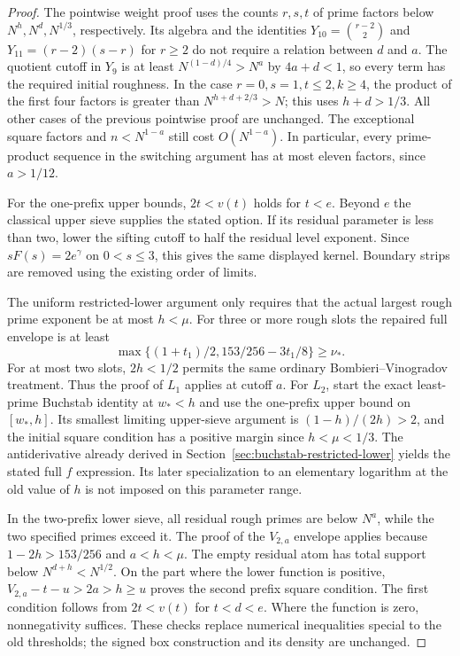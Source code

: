 \begin{proof}
The pointwise weight proof uses the counts $r,s,t$ of prime factors
below $N^h,N^d,N^{1/3}$, respectively. Its algebra and the identities
$Y_{10}=\binom{r-2}{2}$ and $Y_{11}=(r-2)(s-r)$ for $r\ge2$
do not require a relation between $d$ and $a$.
The quotient cutoff in $Y_9$ is at least $N^{(1-d)/4}>N^a$ by
$4a+d<1$, so every term has the required initial roughness.
In the case $r=0,s=1,t\le2,k\ge4$, the product of the first four
factors is greater than $N^{h+d+2/3}>N$; this uses $h+d>1/3$.
All other cases of the previous pointwise proof are unchanged.
The exceptional square factors and $n<N^{1-a}$ still cost
$O(N^{1-a})$. In particular, every prime-product sequence in the
switching argument has at most eleven factors, since $a>1/12$.

For the one-prefix upper bounds, $2t<v(t)$ holds for $t<e$.
Beyond $e$ the classical upper sieve supplies the stated option.
If its residual parameter is less than two, lower the sifting cutoff
to half the residual level exponent. Since $sF(s)=2e^\gamma$ on
$0<s\le3$, this gives the same displayed kernel. Boundary strips
are removed using the existing order of limits.

The uniform restricted-lower argument only requires that the actual
largest rough prime exponent be at most $h<\mu$. For three or more
rough slots the repaired full envelope is at least
\[
 \max\{(1+t_1)/2,153/256-3t_1/8\}\ge\nu_*.
\]
For at most two slots, $2h<1/2$ permits the same ordinary
Bombieri--Vinogradov treatment. Thus the proof of $L_1$ applies at
cutoff $a$. For $L_2$, start the exact least-prime Buchstab identity
at $w_*<h$ and use the one-prefix upper bound on $[w_*,h]$.
Its smallest limiting upper-sieve argument is
$(1-h)/(2h)>2$, and the initial square condition has a positive
margin since $h<\mu<1/3$. The antiderivative already derived in
Section~\ref{sec:buchstab-restricted-lower} yields the stated full
$f$ expression. Its later specialization to an elementary logarithm
at the old value of $h$ is not imposed on this parameter range.

In the two-prefix lower sieve, all residual rough primes are below
$N^a$, while the two specified primes exceed it. The proof of the
$V_{2,a}$ envelope applies because $1-2h>153/256$ and $a<h<\mu$.
The empty residual atom has total support below $N^{d+h}<N^{1/2}$.
On the part where the lower function is positive,
$V_{2,a}-t-u>2a>h\ge u$ proves the second prefix square condition.
The first condition follows from $2t<v(t)$ for $t<d<e$.
Where the function is zero, nonnegativity suffices.
These checks replace numerical inequalities special to the old
thresholds; the signed box construction and its density are unchanged.


\end{proof}
